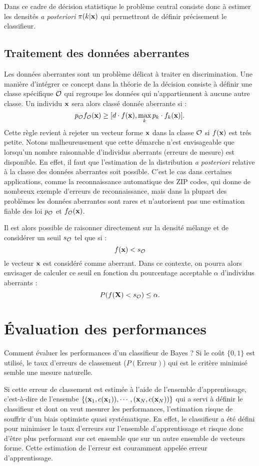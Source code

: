 Dans ce cadre de d\'ecision statistique le probl\`eme central consiste donc \`a estimer les
densit\'es {\em a posteriori} $\pi(k | \mbox{\bf x})$ qui permettront de d\'efinir pr\'ecisement le classifieur. 

\subsection{Traitement des donn\'ees aberrantes}

Les donn\'ees aberrantes sont un probl\`eme d\'elicat \`a traiter en discrimination.
Une mani\`ere d'int\'egrer ce concept dans la th\'eorie de la d\'ecision consiste
\`a d\'efinir une classe sp\'ecifique ${\cal O}$ qui regroupe les donn\'ees
qui n'appartiennent \`a aucune autre classe.  Un individu $\mbox{\bf x}$ sera alors 
class\'e donn\'ee aberrante si :
$$
p_{\cal O} f_{\cal O}(\mbox{\bf x}) \geq [d \cdot f(\mbox{\bf x}) ,\max_k p_k \cdot f_k( \mbox{\bf x})].
$$
Cette r\`egle revient \`a rejeter un vecteur forme $\mbox{\bf x}$ dans la classe 
${\cal O}$ si $f(\mbox{\bf x})$ est tr\'es petite. 
Notons malheureusement que cette d\'emarche n'est envisageable que lorsqu'un
nombre raisonnable d'individus aberrants (erreurs de mesure) est disponible.
En effet, il faut que l'estimation de la distribution {\em a posteriori} 
relative \`a la classe des donn\'ees aberrantes soit possible.
C'est le cas dans certaines applications, comme la reconnaissance automatique
des ZIP codes, qui donne de nombreux exemple d'erreurs de reconnaissance,
mais dans la plupart des probl\`emes les donn\'ees aberrantes sont rares et
n'autorisent pas une estimation fiable des loi  $ p_{\cal O}$ et $f_{\cal O}(\mbox{\bf x})$.

Il est alors possible de raisonner directement sur la densit\'e m\'elange et 
de consid\'erer un seuil $s_{\cal O}$ tel que si :
$$
f(\mbox{\bf x})<s_{\cal O}
$$
le vecteur $\mbox{\bf x}$ est consid\'er\'e comme aberrant. Dans ce contexte, on pourra 
alors envisager de calculer ce seuil en fonction du pourcentage acceptable $\alpha$
d'individus aberrants :
$$
P(f(\mbox{\bf X})<s_{\cal O})\leq \alpha.
$$


\section{\'Evaluation des performances}

Comment \'evaluer les performances d'un classifieur de Bayes ?
Si le co\^ut $\{0,1\}$ est utilis\'e, le taux d'erreurs de 
classement ($P(\mbox{Erreur})$) qui est le crit\`ere 
minimis\'e semble une mesure naturelle. 


Si cette erreur de classement est estim\'ee \`a l'aide de l'ensemble
d'apprentissage, c'est-\`a-dire de l'ensembe $\{(\mbox{\bf x}_1,c(\mbox{\bf x}_1)),\cdots,(\mbox{\bf x}_N,c(\mbox{\bf x}_N))\}$
qui a servi \`a d\'efinir le classifieur et dont on veut mesurer les performances,
l'estimation risque de souffrir d'un biais optimiste quasi syst\'ematique.
En effet, le classifieur a \'et\'e d\'efini pour minimiser le taux d'erreurs
sur l'ensemble d'apprentissage et risque donc d'\^etre plus performant sur
cet ensemble que sur un autre ensemble de vecteurs forme.
Cette estimation de l'erreur est couramment appel\'ee erreur d'apprentissage.



